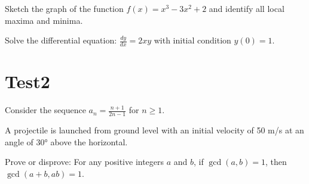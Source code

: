 \documentclass[12pt]{exam}
\begin{document}
\begin{questions}

\question Sketch the graph of the function $f(x) = x^3 - 3x^2 + 2$ and identify all local maxima and minima.

\question Solve the differential equation: $\frac{dy}{dx} = 2xy$ with initial condition $y(0) = 1$.

\section{Test2}
\question Consider the sequence $a_n = \frac{n+1}{2n-1}$ for $n \geq 1$.

\question A projectile is launched from ground level with an initial velocity of 50 m/s at an angle of 30° above the horizontal.

\question Prove or disprove: For any positive integers $a$ and $b$, if $\gcd(a,b) = 1$, then $\gcd(a+b, ab) = 1$.

\end{questions}
\end{document}
